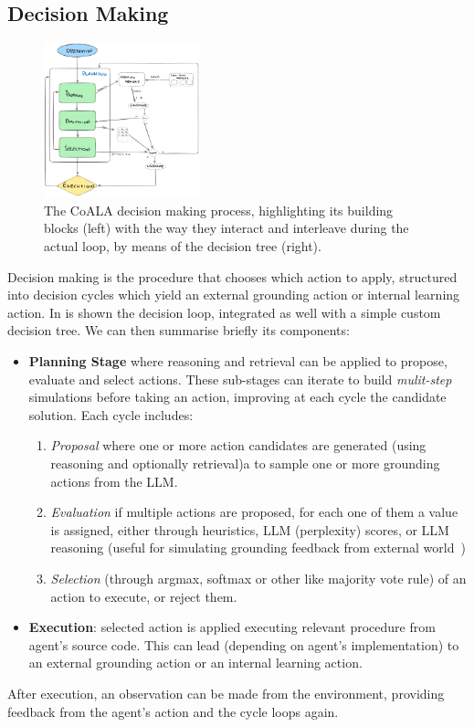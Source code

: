\subsection{Decision Making}
\begin{figure}[ht]
    \centering
    \includegraphics[width=0.4\textwidth]{img/coala-decision-making.png}
    \caption{The \ac{CoALA} decision making process, highlighting its building
        blocks (left) with the way they interact and interleave during the actual
        loop, by means of the decision tree (right).}
    \label{fig:coala-decision-making}
\end{figure}
Decision making is the procedure that chooses which action to apply, structured
into decision cycles which yield an external grounding action or internal
learning action.
In  is shown the decision loop, integrated as well
with a simple custom decision tree. We can then summarise briefly its components:
\begin{itemize}
    \item \textbf{Planning Stage} where reasoning and retrieval can be applied
        to propose, evaluate and select actions. These sub-stages can iterate
        to build \emph{mulit-step} simulations before taking an action,
        improving at each cycle the candidate solution. Each cycle includes:
        \begin{enumerate}
            \item \emph{Proposal} where one or more action candidates are
                generated (using reasoning and optionally retrieval)a to sample
                one or more grounding actions from the \ac{LLM}.
            \item \emph{Evaluation} if multiple actions are proposed, for each
                one of them a value is assigned, either through heuristics,
                \ac{LLM} (perplexity) scores, or \ac{LLM} reasoning (useful for
                simulating grounding feedback from external
                world~\cite{hao2023reasoninglanguagemodelplanning})
            \item \emph{Selection} (through argmax, softmax or other like
                majority vote rule) of an action to execute, or reject them.
        \end{enumerate}
    \item \textbf{Execution}: selected action is applied executing relevant
        procedure from agent's source code. This can lead (depending on agent's
        implementation) to an external grounding action or an internal learning
        action.
\end{itemize}
%
After execution, an observation can be made from the environment, providing
feedback from the agent's action and the cycle loops again.
